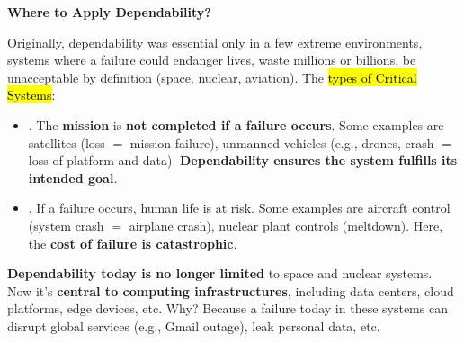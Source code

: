 \highspace
\begin{flushleft}
    \textcolor{Green3}{ \textbf{Where to Apply Dependability?}}
\end{flushleft}
Originally, dependability was essential only in a few extreme environments, systems where a failure could endanger lives, waste millions or billions, be unacceptable by definition (space, nuclear, aviation). The \hl{types of Critical Systems}:
\begin{itemize}
    \item {}. The \textbf{mission} is \textbf{not completed if a failure occurs}. Some examples are satellites (loss $=$ mission failure), unmanned vehicles (e.g., drones, crash $=$ loss of platform and data). \textbf{Dependability ensures the system fulfills its intended goal}.

    \item {}. If a failure occurs, human life is at risk. Some examples are aircraft control (system crash $=$ airplane crash), nuclear plant controls (meltdown). Here, the \textbf{cost of failure is catastrophic}.
\end{itemize}
\textbf{Dependability today is no longer limited} to space and nuclear systems. Now it's \textbf{central to computing infrastructures}, including data centers, cloud platforms, edge devices, etc. Why? Because a failure today in these systems can disrupt global services (e.g., Gmail outage), leak personal data, etc.

\newpage

